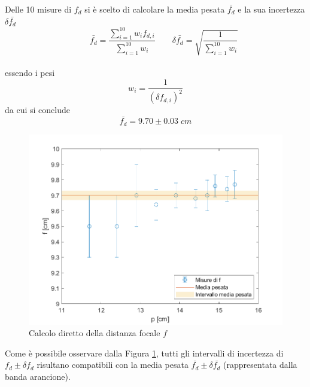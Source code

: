 \documentclass[11pt,a4paper]{article}
\begin{document}
Delle 10 misure di $f_d$ si è scelto di calcolare la media pesata $\bar{f_d}$ e la sua incertezza $\delta \bar{f_d}$
\\
\begin{equation}
    \qquad{\bar{f_d} = \frac{\sum_{i=1}^{10} w_i f_{d,i}}{\sum_{i=1}^{10} w_i }}
    \qquad{\delta \bar{f_d} = \sqrt{\frac{1}{\sum_{i=1}^{10} w_i}}}
    \label{eq:media-pesata-f}
\end{equation}
\\
essendo i pesi
\\
\begin{equation}
    w_i = \frac{1}{(\delta f_{d,i})^2}
\end{equation}
da cui si conclude
\begin{equation}
    \bar{f_d} = 9.70 \pm 0.03 \; cm
    \label{eq:f-diretta-media-pesata}
\end{equation}
\begin{figure}[H]
    \centering
    \includegraphics[scale = .7]{pf.png}
    \caption{Calcolo diretto della distanza focale $f$}
    \label{fig:pf}
\end{figure}

Come è possibile osservare dalla Figura \ref{fig:pf}, tutti gli intervalli di incertezza di $f_d \pm \delta f_d$ risultano compatibili con la media pesata $\bar{f_d} \pm \delta \bar{f_d}$ (rappresentata dalla banda arancione).
\end{document}
